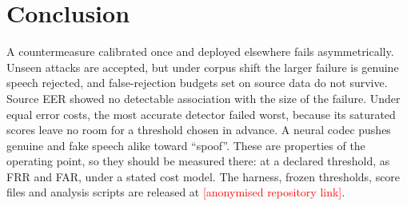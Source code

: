 \documentclass[conference]{IEEEtran}
\newcommand{\todo}[1]{\textcolor{red}{[#1]}}
\newcommand{\repo}{\todo{anonymised repository link}}
\newcommand{\repo}{\todo{public repository URL}}
\begin{document}
\section{Conclusion}
\label{sec:conclusion}
A countermeasure calibrated once and deployed elsewhere fails asymmetrically.
Unseen attacks are accepted, but under corpus shift the larger failure is genuine
speech rejected, and false-rejection budgets set on source data do not survive. Source EER showed no
detectable association with the size of the failure. Under equal error costs,
the most accurate detector failed worst, because its saturated scores leave no
room for a threshold chosen in advance. A neural codec pushes genuine and fake
speech alike toward ``spoof''. These are properties of the
operating point, so they should be measured there: at a declared threshold, as
FRR and FAR, under a stated cost model. The harness, frozen thresholds, score
files and analysis scripts are released at \repo.



\end{document}
